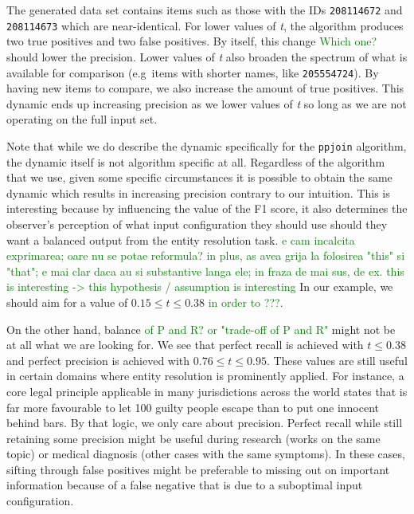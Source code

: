 The generated data set contains items such as those with the IDs
\texttt{208114672} and \texttt{208114673} which are near-identical.
For lower values of \textit{t}, the algorithm produces two true positives and
two false positives.
By itself, this change 
\textcolor{green}{Which one?} 
should lower the precision.
Lower values of \textit{t} also broaden the spectrum of what is available for
comparison (e.g~items with shorter names, like \texttt{205554724}).
By having new items to compare, we also increase the amount of true positives.
This dynamic ends up increasing precision as we lower values of \textit{t} so
long as we are not operating on the full input set.

Note that while we do describe the dynamic specifically for the \texttt{ppjoin}
algorithm, the dynamic itself is not algorithm specific at all.
Regardless of the algorithm that we use, given some specific circumstances it is
possible to obtain the same dynamic which results in increasing precision
contrary to our intuition.
This is interesting because by influencing the value of the F1 score, it also
determines the observer's perception of what input configuration they should use
should they want a balanced output from the entity resolution task. 
\textcolor{green}{e cam incalcita exprimarea; oare nu se potae reformula? in plus, as avea grija la folosirea "this" si "that"; e mai clar daca au si substantive langa ele; in fraza de mai sus, de ex. this is interesting -> this hypothesis / assumption is interesting} 
In our example, we should aim for a value of $0.15\leq t \leq 0.38$ \textcolor{green}{in order to ???}.

On the other hand, balance 
\textcolor{green}{of P and R? or "trade-off of P and R"} 
might not be at all what we are looking for.
We see that perfect recall is achieved with $t \leq 0.38$ and perfect precision
is achieved with $0.76 \leq t \leq 0.95$.
These values are still useful in certain domains where entity resolution is
prominently applied.
For instance, a core legal principle applicable in many jurisdictions across the
world states that is far more favourable to let 100 guilty people escape than to
put one innocent behind bars.
By that logic, we only care about precision.
Perfect recall while still retaining some precision might be useful during
research (works on the same topic) or medical diagnosis (other cases with the same
symptoms).
In these cases, sifting through false positives might be preferable to missing
out on important information because of a false negative that is due to a
suboptimal input configuration.

